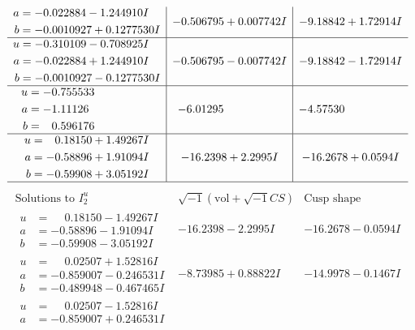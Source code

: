 \documentclass[1p]{elsarticle_modified}
\theoremstyle{definition}
\newcommand{\I}{\sqrt{-1}}
\begin{document}
$$\begin{array}{c|c|c}
\begin{aligned}
a &= -0.022884 - 1.244910 I \\
b &= -0.0010927 + 0.1277530 I\end{aligned}
 & -0.506795 + 0.007742 I & -9.18842 + 1.72914 I \\ \hline\begin{aligned}
u &= -0.310109 - 0.708925 I \\
a &= -0.022884 + 1.244910 I \\
b &= -0.0010927 - 0.1277530 I\end{aligned}
 & -0.506795 - 0.007742 I & -9.18842 - 1.72914 I \\ \hline\begin{aligned}
u &= -0.755533\phantom{ +0.000000I} \\
a &= -1.11126\phantom{ +0.000000I} \\
b &= \phantom{-}0.596176\phantom{ +0.000000I}\end{aligned}
 & -6.01295\phantom{ +0.000000I} & -4.57530\phantom{ +0.000000I} \\ \hline\begin{aligned}
u &= \phantom{-}0.18150 + 1.49267 I \\
a &= -0.58896 + 1.91094 I \\
b &= -0.59908 + 3.05192 I\end{aligned}
 & -16.2398 + 2.2995 I & -16.2678 + 0.0594 I\\
 \hline 
 \end{array}$$\newpage$$\begin{array}{c|c|c}  
\text{Solutions to }I^u_{2}& \I (\text{vol} + \sqrt{-1}CS) & \text{Cusp shape}\\
 \hline 
\begin{aligned}
u &= \phantom{-}0.18150 - 1.49267 I \\
a &= -0.58896 - 1.91094 I \\
b &= -0.59908 - 3.05192 I\end{aligned}
 & -16.2398 - 2.2995 I & -16.2678 - 0.0594 I \\ \hline\begin{aligned}
u &= \phantom{-}0.02507 + 1.52816 I \\
a &= -0.859007 - 0.246531 I \\
b &= -0.489948 - 0.467465 I\end{aligned}
 & -8.73985 + 0.88822 I & -14.9978 - 0.1467 I \\ \hline\begin{aligned}
u &= \phantom{-}0.02507 - 1.52816 I \\
a &= -0.859007 + 0.246531 I \\

\end{aligned}
\end{array}$$
\end{document}
